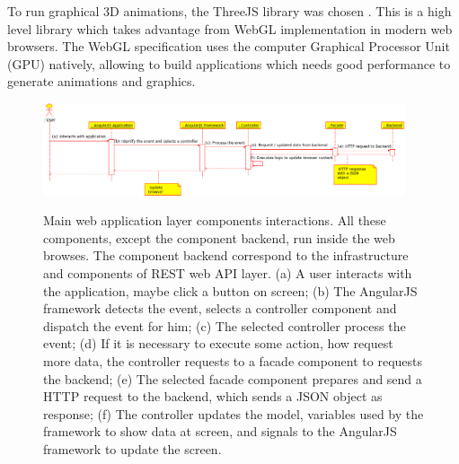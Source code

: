 \documentclass[journal]{IEEEtran}
\begin{document}
To run graphical 3D animations, the ThreeJS library was chosen \cite{Dirksen2015}.
This is a high level library  which takes advantage from WebGL implementation in modern web browsers.
The WebGL specification \cite{Matsuda2013} uses the computer Graphical Processor Unit (GPU) natively, 
allowing to build applications which needs good performance to generate animations and graphics.

\begin{figure}[tb]
	\centering
	{\includegraphics[width=0.95\textwidth]{img/web_components.eps}}
	\caption{Main web application layer components interactions.
		All these components, except the component backend, run inside the web browses.
		The component backend correspond to the infrastructure and components of REST web API layer.
		(a) A user interacts with the application, maybe click a button on screen;
		(b) The AngularJS framework detects the event, selects a controller component and
		dispatch the event for him;
		(c) The selected controller process the event;
		(d) If it is necessary to execute some action, how request more data, the controller 
		requests to a facade component to requests the backend;
		(e) The selected facade component prepares and send a HTTP request to the backend,
		which sends a JSON object as response;
		(f) The controller updates the model, variables used by the framework to show data at screen,
		and signals to the AngularJS framework to update the screen.
	}
	\label{web_components}
\end{figure}
\end{document}
